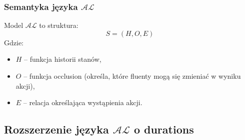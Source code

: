 \documentclass{article}
\begin{document}
\subsubsection{Semantyka języka $\mathcal{AL}$}
Model $\mathcal{AL}$ to struktura:
$$S = (H, O, E)$$
Gdzie:
\begin{itemize}
    \item $H$ – funkcja historii stanów,
    \item $O$ – funkcja occlusion (określa, które fluenty mogą się zmieniać w wyniku akcji),
    \item $E$ – relacja określająca wystąpienia akcji.
\end{itemize}

\subsection{Rozszerzenie języka $\mathcal{AL}$ o durations}
\label{sec:opis-jezyka-al-z-durations}
\end{document}
